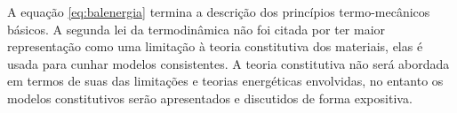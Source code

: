 A equação \ref{eq:balenergia} termina a descrição dos princípios termo-mecânicos básicos. A segunda lei da termodinâmica não foi citada por ter maior representação como uma limitação à teoria constitutiva dos materiais, elas é usada para cunhar modelos consistentes. A teoria constitutiva não será abordada em termos de suas das limitações e teorias energéticas envolvidas, no entanto os modelos constitutivos serão apresentados e discutidos de forma expositiva.





